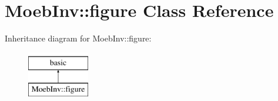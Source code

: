 \hypertarget{class_moeb_inv_1_1figure}{}\section{Moeb\+Inv\+:\+:figure Class Reference}
\label{class_moeb_inv_1_1figure}
Inheritance diagram for Moeb\+Inv\+:\+:figure\+:\begin{figure}[H]
\begin{center}
\leavevmode
\includegraphics[height=2.000000cm]{class_moeb_inv_1_1figure}
\end{center}
\end{figure}
